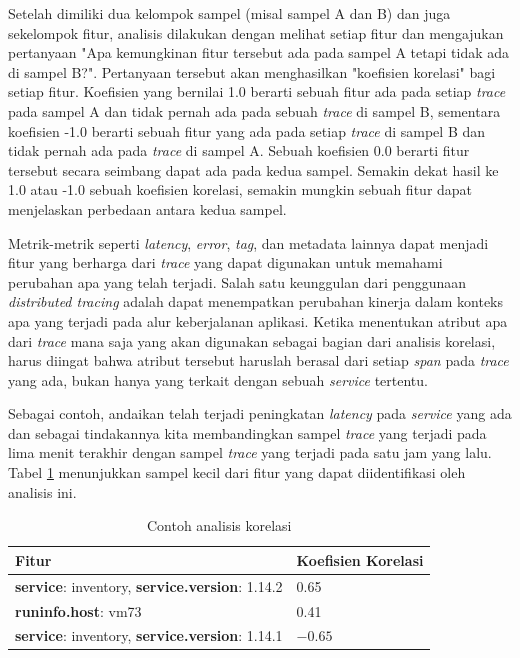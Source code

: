 Setelah dimiliki dua kelompok sampel (misal sampel A dan B) dan juga sekelompok fitur, analisis dilakukan dengan melihat setiap fitur dan mengajukan pertanyaan "Apa kemungkinan fitur tersebut ada pada sampel A tetapi tidak ada di sampel B?". Pertanyaan tersebut akan menghasilkan "koefisien korelasi" bagi setiap fitur. Koefisien yang bernilai 1.0 berarti sebuah fitur ada pada setiap \textit{trace} pada sampel A dan tidak pernah ada pada sebuah \textit{trace} di sampel B, sementara koefisien -1.0 berarti sebuah fitur yang ada pada setiap \textit{trace} di sampel B dan tidak pernah ada pada \textit{trace} di sampel A. Sebuah koefisien 0.0 berarti fitur tersebut secara seimbang dapat ada pada kedua sampel. Semakin dekat hasil ke 1.0 atau -1.0 sebuah koefisien korelasi, semakin mungkin sebuah fitur dapat menjelaskan perbedaan antara kedua sampel.

Metrik-metrik seperti \textit{latency}, \textit{error}, \textit{tag}, dan metadata lainnya dapat menjadi fitur yang berharga dari \textit{trace} yang dapat digunakan untuk memahami perubahan apa yang telah terjadi. Salah satu keunggulan dari penggunaan \textit{distributed tracing} adalah dapat menempatkan perubahan kinerja dalam konteks apa yang terjadi pada alur keberjalanan aplikasi. Ketika menentukan atribut apa dari \textit{trace} mana saja yang akan digunakan sebagai bagian dari analisis korelasi, harus diingat bahwa atribut tersebut haruslah berasal dari setiap \textit{span} pada \textit{trace} yang ada, bukan hanya yang terkait dengan sebuah \textit{service} tertentu.

Sebagai contoh, andaikan telah terjadi peningkatan \textit{latency} pada \textit{service} yang ada dan sebagai tindakannya kita membandingkan sampel \textit{trace} yang terjadi pada lima menit terakhir dengan sampel \textit{trace} yang terjadi pada satu jam yang lalu. Tabel \ref{corr-tab-1} menunjukkan sampel kecil dari fitur yang dapat diidentifikasi oleh analisis ini.

\begin{small}
	\begin{longtable}{ | p{10cm} | p{2cm} | }
			\caption{Contoh analisis korelasi}
			\label{corr-tab-1}                                                           
			\\ \hline
			\centering\bfseries{Fitur} & \centering\bfseries{Koefisien Korelasi} \tabularnewline \hline
			\endfirsthead
			\textbf{service}: inventory, \textbf{service.version}: 1.14.2 & 0.65 \\ \hline
			\textbf{runinfo.host}: vm73 & 0.41 \\ \hline
			\textbf{service}: inventory, \textbf{service.version}: 1.14.1 &  $\num{-0.65}$ \\ \hline
		\end{longtable}
\end{small}

